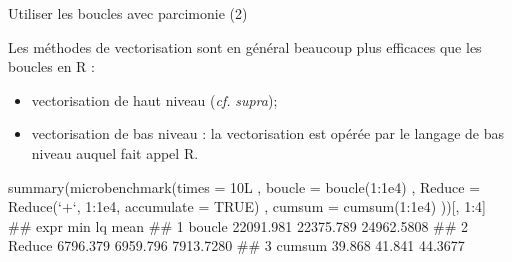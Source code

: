 \documentclass[12pt,ignorenonframetext,handout,]{beamer}
\newenvironment{Shaded}{}{}
\newcommand{\DataTypeTok}[1]{#1}
\newcommand{\DecValTok}[1]{#1}
\newcommand{\FloatTok}[1]{#1}
\newcommand{\KeywordTok}[1]{\textcolor[rgb]{0.00,0.00,1.00}{#1}}
\newcommand{\NormalTok}[1]{#1}
\newcommand{\OperatorTok}[1]{#1}
\newcommand{\OtherTok}[1]{\textcolor[rgb]{1.00,0.25,0.00}{#1}}
\newcommand{\StringTok}[1]{\textcolor[rgb]{0.00,0.50,0.50}{#1}}
\providecommand{\tightlist}{%
  \setlength{\itemsep}{0pt}\setlength{\parskip}{0pt}}
\renewenvironment{Shaded}{\begin{snugshade}}{\end{snugshade}}
\begin{document}
\begin{frame}[fragile]{Utiliser les boucles avec parcimonie (2)}
\protect\hypertarget{utiliser-les-boucles-avec-parcimonie-2}{}

\small

Les méthodes de vectorisation sont en général beaucoup plus efficaces
que les boucles en R :

\begin{itemize}
\tightlist
\item
  vectorisation de haut niveau (\emph{cf.} \emph{supra});
\item
  vectorisation de bas niveau : la vectorisation est opérée par le
  langage de bas niveau auquel fait appel R.
\end{itemize}

\pause \footnotesize

\begin{Shaded}
\begin{Highlighting}[]
\KeywordTok{summary}\NormalTok{(}\KeywordTok{microbenchmark}\NormalTok{(}\DataTypeTok{times =}\NormalTok{ 10L}
\NormalTok{  , }\DataTypeTok{boucle =} \KeywordTok{boucle}\NormalTok{(}\DecValTok{1}\OperatorTok{:}\FloatTok{1e4}\NormalTok{)}
\NormalTok{  , }\DataTypeTok{Reduce =} \KeywordTok{Reduce}\NormalTok{(}\StringTok{`}\DataTypeTok{+}\StringTok{`}\NormalTok{, }\DecValTok{1}\OperatorTok{:}\FloatTok{1e4}\NormalTok{, }\DataTypeTok{accumulate =} \OtherTok{TRUE}\NormalTok{)}
\NormalTok{  , }\DataTypeTok{cumsum =} \KeywordTok{cumsum}\NormalTok{(}\DecValTok{1}\OperatorTok{:}\FloatTok{1e4}\NormalTok{)}
\NormalTok{))[, }\DecValTok{1}\OperatorTok{:}\DecValTok{4}\NormalTok{]}
\NormalTok{  ##     expr       min        lq       mean}
\NormalTok{  ## 1 boucle 22091.981 22375.789 24962.5808}
\NormalTok{  ## 2 Reduce  6796.379  6959.796  7913.7280}
\NormalTok{  ## 3 cumsum    39.868    41.841    44.3677}
\end{Highlighting}
\end{Shaded}

\end{frame}
\end{document}
